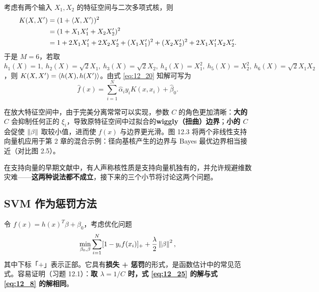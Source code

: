 考虑有两个输入 $X_1,X_2$ 的特征空间与二次多项式核，则
\begin{equation}
\begin{aligned}
K(X,X') &= (1 + \langle X,X'\rangle)^2 \\
&= (1 + X_1 X_1' + X_2 X_2')^2 \\
&= 1 + 2X_1 X_1' + 2X_2 X_2' + (X_1 X_1')^2 + (X_2 X_2')^2 + 2X_1 X_1' X_2 X_2'.
\end{aligned} \label{eq:12_23}
\end{equation}
于是 $M=6$，若取 $h_1(X)=1,\ h_2(X)=\sqrt{2}X_1,\ h_3(X)=\sqrt{2}X_2,\ h_4(X)=X_1^2,\ h_5(X)=X_2^2,\ h_6(X)=\sqrt{2}X_1 X_2$，则 $K(X,X')=\langle h(X),h(X')\rangle$。由式 \ref{eq:12_20} 知解可写为
\begin{equation}
\hat f(x) = \sum_{i=1}^{N}\hat\alpha_i y_i K(x,x_i) + \hat\beta_0. \label{eq:12_24}
\end{equation}

\begin{remark}
在放大特征空间中，由于完美分离常常可以实现，参数 $C$ 的角色更加清晰：\textbf{大的 $C$} 会抑制任何正的 $\xi_i$，导致原特征空间中过拟合的\textbf{wiggly（扭曲）边界}；\textbf{小的 $C$} 会促使 $\left\lVert\beta\right\rVert$ 取较小值，进而使 $f(x)$ 与边界更光滑。图 12.3 将两个非线性支持向量机应用于第 2 章的混合示例：径向基核产生的边界与 Bayes 最优边界相当接近（对比图 2.5）。

在支持向量的早期文献中，有人声称核性质是支持向量机独有的，并允许规避维数灾难——\textbf{这两种说法都不成立}，接下来的三个小节将讨论这两个问题。
\end{remark}

\subsection{SVM 作为惩罚方法}

令 $f(x) = h(x)^T\beta + \beta_0$，考虑优化问题
\begin{equation}
\min_{\beta_0,\beta} \sum_{i=1}^{N}[1 - y_i f(x_i)]_+ + \frac{\lambda}{2}\left\lVert\beta\right\rVert^2, \label{eq:12_25}
\end{equation}
其中下标「$+$」表示正部。它具有\textbf{损失 + 惩罚}的形式，是函数估计中的常见范式。容易证明（习题 12.1）：\textbf{取 $\lambda = 1/C$ 时，式 \ref{eq:12_25} 的解与式 \ref{eq:12_8} 的解相同}。


